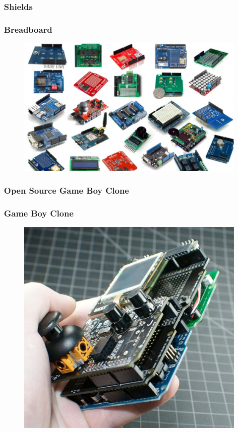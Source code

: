 \begin{frame}
	\frametitle{Shields}
	\frametitle{Breadboard}
	\begin{figure}
		\includegraphics[scale=.28]{assets/shields} 
	\end{figure}
\end{frame}

\begin{frame}
	\frametitle{Open Source Game Boy Clone}
	\frametitle{Game Boy Clone}
	\begin{figure}
		\includegraphics[scale=.32]{assets/gameboy} 
	\end{figure}
\end{frame}

